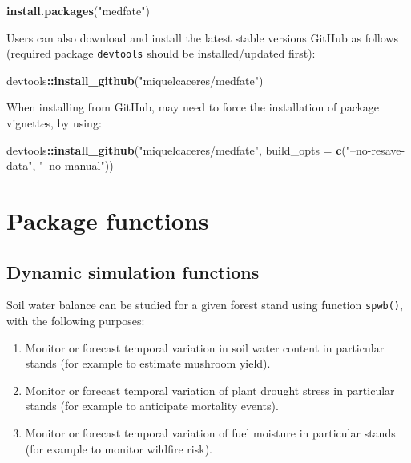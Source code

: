 \documentclass[]{book}
\newenvironment{Shaded}{\begin{snugshade}}{\end{snugshade}}
\newcommand{\KeywordTok}[1]{\textcolor[rgb]{0.13,0.29,0.53}{\textbf{#1}}}
\newcommand{\DataTypeTok}[1]{\textcolor[rgb]{0.13,0.29,0.53}{#1}}
\newcommand{\StringTok}[1]{\textcolor[rgb]{0.31,0.60,0.02}{#1}}
\newcommand{\OperatorTok}[1]{\textcolor[rgb]{0.81,0.36,0.00}{\textbf{#1}}}
\newcommand{\NormalTok}[1]{#1}
\providecommand{\tightlist}{%
  \setlength{\itemsep}{0pt}\setlength{\parskip}{0pt}}
\begin{document}
\begin{Shaded}
\begin{Highlighting}[]
\KeywordTok{install.packages}\NormalTok{(}\StringTok{"medfate"}\NormalTok{)}
\end{Highlighting}
\end{Shaded}

Users can also download and install the latest stable versions GitHub as
follows (required package \texttt{devtools} should be installed/updated
first):

\begin{Shaded}
\begin{Highlighting}[]
\NormalTok{devtools}\OperatorTok{::}\KeywordTok{install_github}\NormalTok{(}\StringTok{"miquelcaceres/medfate"}\NormalTok{)}
\end{Highlighting}
\end{Shaded}

When installing from GitHub, may need to force the installation of
package vignettes, by using:

\begin{Shaded}
\begin{Highlighting}[]
\NormalTok{devtools}\OperatorTok{::}\KeywordTok{install_github}\NormalTok{(}\StringTok{"miquelcaceres/medfate"}\NormalTok{, }
                         \DataTypeTok{build_opts =} \KeywordTok{c}\NormalTok{(}\StringTok{"--no-resave-data"}\NormalTok{, }\StringTok{"--no-manual"}\NormalTok{))}
\end{Highlighting}
\end{Shaded}

\section{Package functions}\label{package-functions}

\subsection{Dynamic simulation
functions}\label{dynamic-simulation-functions}

Soil water balance can be studied for a given forest stand using
function \texttt{spwb()}, with the following purposes:

\begin{enumerate}
\def\labelenumi{\arabic{enumi}.}
\tightlist
\item
  Monitor or forecast temporal variation in soil water content in
  particular stands (for example to estimate mushroom yield).
\item
  Monitor or forecast temporal variation of plant drought stress in
  particular stands (for example to anticipate mortality events).
\item
  Monitor or forecast temporal variation of fuel moisture in particular
  stands (for example to monitor wildfire risk).
\end{enumerate}
\end{document}
